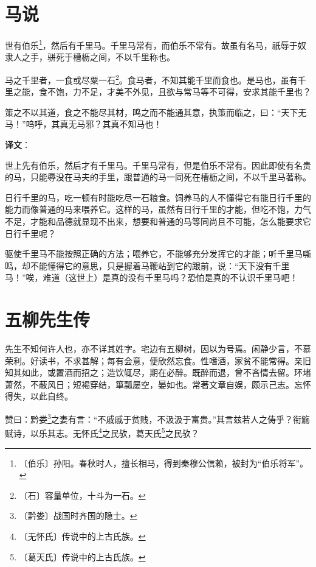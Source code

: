 \documentclass[12pt,UTF-8,openany]{ctexbook}
\begin{document}
\chapter{马说}

\begin{normalsize}
    
    世有伯乐\footnote{〔伯乐〕孙阳。春秋时人，擅长相马，得到秦穆公信赖，被封为“伯乐将军”。}，然后有千里马。千里马常有，而伯乐不常有。故虽有名马，祇辱于奴隶人之手，骈死于槽枥之间，不以千里称也。
    
    马之千里者，一食或尽粟一石\footnote{〔石〕容量单位，十斗为一石。}。食马者，不知其能千里而食也。是马也，虽有千里之能，食不饱，力不足，才美不外见，且欲与常马等不可得，安求其能千里也？
    
    策之不以其道，食之不能尽其材，鸣之而不能通其意，执策而临之，曰：“天下无马！”呜呼，其真无马邪？其真不知马也！
\end{normalsize}


\newpage

\textbf{译文}：

\vspace{1em}

\begin{normalsize}
    
    世上先有伯乐，然后才有千里马。千里马常有，但是伯乐不常有。因此即使有名贵的马，只能辱没在马夫的手里，跟普通的马一同死在槽枥之间，不以千里马著称。
    
    日行千里的马，吃一顿有时能吃尽一石粮食。饲养马的人不懂得它有能日行千里的能力而像普通的马来喂养它。这样的马，虽然有日行千里的才能，但吃不饱，力气不足，才能和品德就显现不出来，想要和普通的马等同尚且不可能，怎么能要求它日行千里呢？
    
    驱使千里马不能按照正确的方法；喂养它，不能够充分发挥它的才能；听千里马嘶鸣，却不能懂得它的意思，只是握着马鞭站到它的跟前，说：“天下没有千里马！”唉，难道（这世上）是真的没有千里马吗？恐怕是真的不认识千里马吧！
    
\end{normalsize}



\chapter{五柳先生传}

\begin{normalsize}
    
    先生不知何许人也，亦不详其姓字。宅边有五柳树，因以为号焉。闲静少言，不慕荣利。好读书，不求甚解；每有会意，便欣然忘食。性嗜酒，家贫不能常得。亲旧知其如此，或置酒而招之；造饮辄尽，期在必醉。既醉而退，曾不吝情去留。环堵萧然，不蔽风日；短褐穿结，箪瓢屡空，晏如也。常著文章自娱，颇示己志。忘怀得失，以此自终。
    
    赞曰：黔娄\footnote{〔黔娄〕战国时齐国的隐士。}之妻有言：“不戚戚于贫贱，不汲汲于富贵。”其言兹若人之俦乎？衔觞赋诗，以乐其志。无怀氏\footnote{〔无怀氏〕传说中的上古氏族。}之民欤，葛天氏\footnote{〔葛天氏〕传说中的上古氏族。}之民欤？
\end{normalsize}
\end{document}
